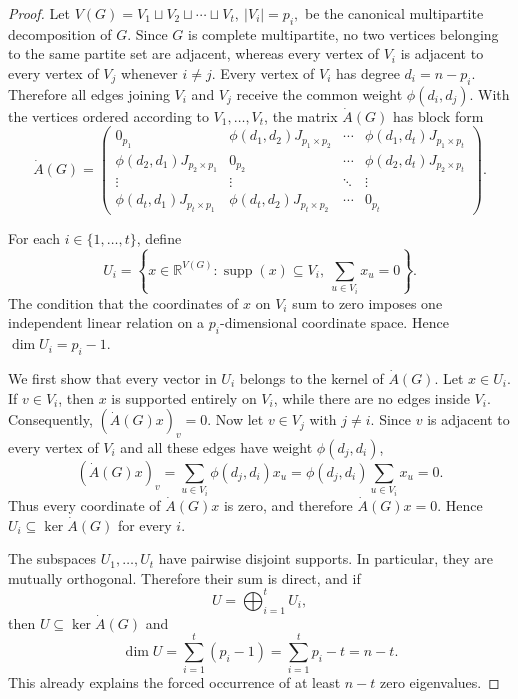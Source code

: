 \documentclass[10pt,a4paper]{amsart}
\begin{document}
\begin{proof}
	Let
	$
	V(G)=V_1\sqcup V_2\sqcup\cdots\sqcup V_t,
	~ |V_i|=p_i,
	$
	be the canonical multipartite decomposition of $G$. Since $G$ is complete multipartite, no two vertices belonging to the same partite set are adjacent, whereas every vertex of $V_i$ is adjacent to every vertex of $V_j$ whenever $i\neq j$. Every vertex of $V_i$ has degree
	$
	d_i=n-p_i.
	$
	Therefore all edges joining $V_i$ and $V_j$ receive the common weight
	$
	\phi(d_i,d_j).
	$
	With the vertices ordered according to $V_1,\ldots,V_t$, the matrix $\dot A(G)$ has block form
	$$
	\dot A(G)
	=
	\begin{pmatrix}
		0_{p_1}
		&
		\phi(d_1,d_2)J_{p_1\times p_2}
		&
		\cdots
		&
		\phi(d_1,d_t)J_{p_1\times p_t}
		\\
		\phi(d_2,d_1)J_{p_2\times p_1}
		&
		0_{p_2}
		&
		\cdots
		&
		\phi(d_2,d_t)J_{p_2\times p_t}
		\\
		\vdots
		&
		\vdots
		&
		\ddots
		&
		\vdots
		\\
		\phi(d_t,d_1)J_{p_t\times p_1}
		&
		\phi(d_t,d_2)J_{p_t\times p_2}
		&
		\cdots
		&
		0_{p_t}
	\end{pmatrix}.
	$$
	
	For each $i\in\{1,\ldots,t\}$, define
	$$
	U_i
	=
	\left\{
	x\in\mathbb R^{V(G)}:
	\operatorname{supp}(x)\subseteq V_i,\ 
	\sum_{u\in V_i}x_u=0
	\right\}.
	$$
	The condition that the coordinates of $x$ on $V_i$ sum to zero imposes one independent linear relation on a $p_i$-dimensional coordinate space. Hence
	$
	\dim U_i=p_i-1.
	$
	
	We first show that every vector in $U_i$ belongs to the kernel of $\dot A(G)$. Let $x\in U_i$. If $v\in V_i$, then $x$ is supported entirely on $V_i$, while there are no edges inside $V_i$. Consequently,
	$
	(\dot A(G)x)_v=0.
	$
	Now let $v\in V_j$ with $j\neq i$. Since $v$ is adjacent to every vertex of $V_i$ and all these edges have weight $\phi(d_j,d_i)$,
	$$
	(\dot A(G)x)_v
	=
	\sum_{u\in V_i}\phi(d_j,d_i)x_u
	=
	\phi(d_j,d_i)\sum_{u\in V_i}x_u
	=
	0.
	$$
	Thus every coordinate of $\dot A(G)x$ is zero, and therefore
	$
	\dot A(G)x=0.
	$
	Hence
	$
	U_i\subseteq\ker\dot A(G)
	$
	for every $i$.
	
	The subspaces $U_1,\ldots,U_t$ have pairwise disjoint supports. In particular, they are mutually orthogonal. Therefore their sum is direct, and if
	$$
	U=\bigoplus_{i=1}^t U_i,
	$$
	then
	$
	U\subseteq\ker\dot A(G)
	$
	and
	$$
	\dim U
	=
	\sum_{i=1}^t(p_i-1)
	=
	\sum_{i=1}^t p_i-t
	=
	n-t.
	$$
	This already explains the forced occurrence of at least $n-t$ zero eigenvalues.
	

\end{proof}
\end{document}

